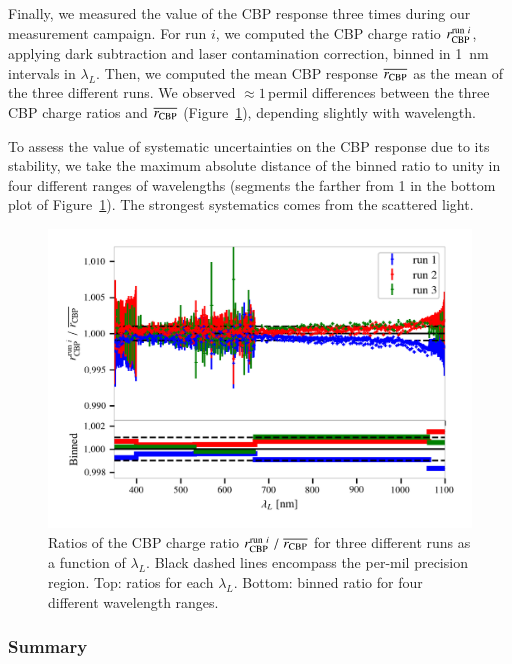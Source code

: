 Finally, we measured the value of the CBP response three times during our measurement campaign. For run $i$, we computed the CBP charge ratio $r_{\rm CBP}^{\mathrm{run}\ i}$, applying dark subtraction and laser contamination correction, binned in \SI{1}{\nano\meter} intervals in $\lambda_L$. Then, we computed the mean CBP response $\overline{r_{\rm CBP}}$ as the mean of the three different runs. We observed $\approx 1$\,permil differences between the three CBP charge ratios and $\overline{r_{\rm CBP}}$ (Figure~\ref{fig:SCrepeatability}), depending slightly with wavelength.


To assess the value of systematic uncertainties on the CBP response due to its stability, we take the maximum absolute distance of the binned ratio to unity in four different ranges of wavelengths (segments the farther from 1 in the bottom plot of Figure~\ref{fig:SCrepeatability}). The strongest systematics comes from the scattered light.

\begin{figure}[h]
    \centering
    \includegraphics[width=\columnwidth]{fig/sc_runi_ratios.png}
    \caption{Ratios of the CBP charge ratio $r_{\rm CBP}^{\mathrm{run}\ i}\;/\;\overline{r_{\rm CBP}}$ for three different runs as a function of $\lambda_L$. Black dashed lines encompass the per-mil precision region. Top: ratios for each $\lambda_L$. Bottom: binned ratio for four different wavelength ranges.}
    \label{fig:SCrepeatability}
\end{figure}

\subsubsection{Summary}\label{sec:cbp_summary}

